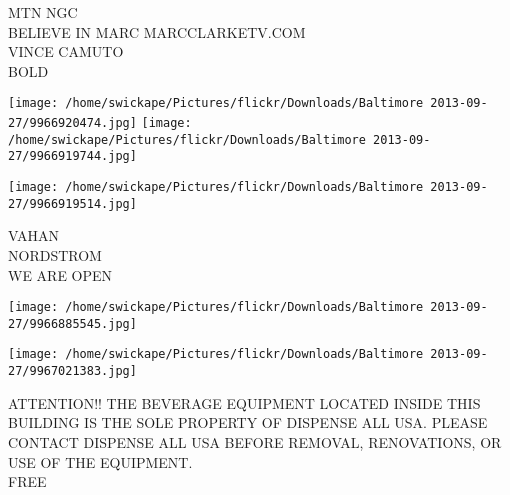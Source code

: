 \documentclass[10pt,letterpaper]{article}
\begin{document}
MTN NGC\\
BELIEVE IN MARC MARCCLARKETV.COM\\
VINCE CAMUTO\\
BOLD
\pagebreak

\texttt{[image: /home/swickape/Pictures/flickr/Downloads/Baltimore 2013-09-27/9966920474.jpg]}
\texttt{[image: /home/swickape/Pictures/flickr/Downloads/Baltimore 2013-09-27/9966919744.jpg]}

\texttt{[image: /home/swickape/Pictures/flickr/Downloads/Baltimore 2013-09-27/9966919514.jpg]}

VAHAN\\
NORDSTROM\\
WE ARE OPEN
\pagebreak

\texttt{[image: /home/swickape/Pictures/flickr/Downloads/Baltimore 2013-09-27/9966885545.jpg]}

\vspace{0.25in}
\texttt{[image: /home/swickape/Pictures/flickr/Downloads/Baltimore 2013-09-27/9967021383.jpg]}

ATTENTION!! THE BEVERAGE EQUIPMENT LOCATED INSIDE THIS BUILDING IS THE SOLE PROPERTY OF DISPENSE ALL USA.  PLEASE CONTACT DISPENSE ALL USA BEFORE REMOVAL, RENOVATIONS, OR USE OF THE EQUIPMENT.\\
FREE
\pagebreak
\end{document}
